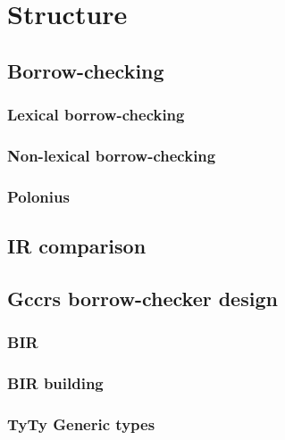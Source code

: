 \hypertarget{structure}{%
\section{Structure}\label{structure}}

\hypertarget{borrow-checking}{%
\subsection{Borrow-checking}\label{borrow-checking}}

\hypertarget{lexical-borrow-checking}{%
\subsubsection{Lexical borrow-checking}\label{lexical-borrow-checking}}

\hypertarget{non-lexical-borrow-checking}{%
\subsubsection{Non-lexical
borrow-checking}\label{non-lexical-borrow-checking}}

\hypertarget{polonius}{%
\subsubsection{Polonius}\label{polonius}}

\hypertarget{ir-comparison}{%
\subsection{IR comparison}\label{ir-comparison}}

\hypertarget{gccrs-borrow-checker-design}{%
\subsection{Gccrs borrow-checker
design}\label{gccrs-borrow-checker-design}}

\hypertarget{bir}{%
\subsubsection{BIR}\label{bir}}

\hypertarget{bir-building}{%
\subsubsection{BIR building}\label{bir-building}}

\hypertarget{tyty-generic-types}{%
\subsubsection{TyTy Generic types}\label{tyty-generic-types}}

